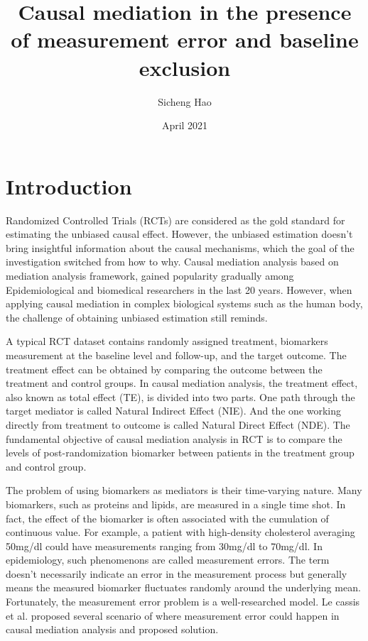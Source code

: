 \documentclass{article}
\title{Causal mediation in the presence of measurement error and baseline exclusion}
\author{Sicheng Hao}
\date{April 2021}
\begin{document}
\maketitle

\section{Introduction}


Randomized Controlled Trials (RCTs) are considered as the gold standard for estimating the unbiased causal effect. However, the unbiased estimation doesn’t  bring insightful information about the causal mechanisms, which the goal of the investigation switched from how to why. Causal mediation analysis based on mediation analysis framework, gained popularity gradually among Epidemiological and biomedical researchers in the last 20 years. However, when applying causal mediation in complex biological systems such as the human body, the challenge of obtaining unbiased estimation still reminds. 

A typical RCT dataset contains randomly assigned treatment, biomarkers measurement at the baseline level and follow-up, and the target outcome.  The treatment effect can be obtained by comparing the outcome between the treatment and control groups. In causal mediation analysis, the treatment effect, also known as total effect (TE), is divided into two parts. One path through the target mediator is called Natural Indirect Effect (NIE). And the one working directly from treatment to outcome is called Natural Direct Effect (NDE). \cite{vanderweele2015explanation} The fundamental objective of causal mediation analysis in RCT is to compare the levels of post-randomization biomarker between patients in the treatment group and control group. 

The problem of using biomarkers as mediators is their time-varying nature. Many biomarkers, such as proteins and lipids, are measured in a single time shot. In fact, the effect of the biomarker is often associated with the cumulation of continuous value. For example, a patient with high-density cholesterol averaging 50mg/dl could have measurements ranging from 30mg/dl to 70mg/dl. \cite{barnett2005regression} In epidemiology, such phenomenons are called measurement errors. \cite{carroll2006measurement} The term doesn’t necessarily indicate an error in the measurement process but generally means the measured biomarker fluctuates randomly around the underlying mean. Fortunately, the measurement error problem is a well-researched model. Le cassis et al. proposed several scenario of where measurement error could happen in causal mediation analysis and proposed solution. \cite{le2012quantification}
\end{document}
